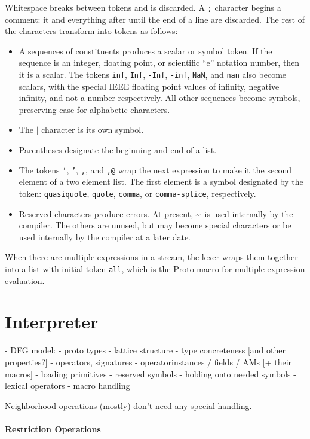 \documentclass{article}
\begin{document}
Whitespace breaks between tokens and is discarded.  A {\tt ;} character
begins a comment: it and everything after until the end of a line are
discarded.  The rest of the characters transform into tokens as follows:
\begin{itemize}
  \item A sequences of constituents produces a scalar or symbol token.  If the
  sequence is an integer, floating point, or scientific ``e'' notation number,
  then it is a scalar.  The tokens {\tt inf}, {\tt Inf}, {\tt -Inf}, {\tt -inf},
  {\tt NaN}, and {\tt nan} also become scalars, with the special IEEE
  floating point values of infinity, negative infinity, and not-a-number
  respectively.  All other sequences become symbols, preserving case for
  alphabetic characters.
  \item The {\tt $|$} character is its own symbol.
  \item Parentheses designate the beginning and end of a list.
  \item The tokens {\tt `}, {\tt '}, {\tt ,}, and {\tt ,@} wrap the next
  expression to make it the second element of a two element list.  The first
  element is a symbol designated by the token: {\tt quasiquote}, {\tt quote}, 
  {\tt comma}, or {\tt comma-splice}, respectively.
  \item Reserved characters produce errors.  At present, \textasciitilde~is
  used internally by the compiler.  The others are unused, but may become
  special characters or be used internally by the compiler at a later date.
\end{itemize}

When there are multiple expressions in a stream, the lexer wraps them together
into a list with initial token {\tt all}, which is the Proto macro for multiple
expression evaluation.

\section{Interpreter}
- DFG model:
 - proto types
  - lattice structure
  - type concreteness [and other properties?]
 - operators, signatures
 - operatorinstances / fields / AMs [+ their macros]
- loading primitives
- reserved symbols
- holding onto needed symbols
- lexical operators
- macro handling

Neighborhood operations (mostly) don't need any special handling.

\paragraph{Restriction Operations}
\end{document}

